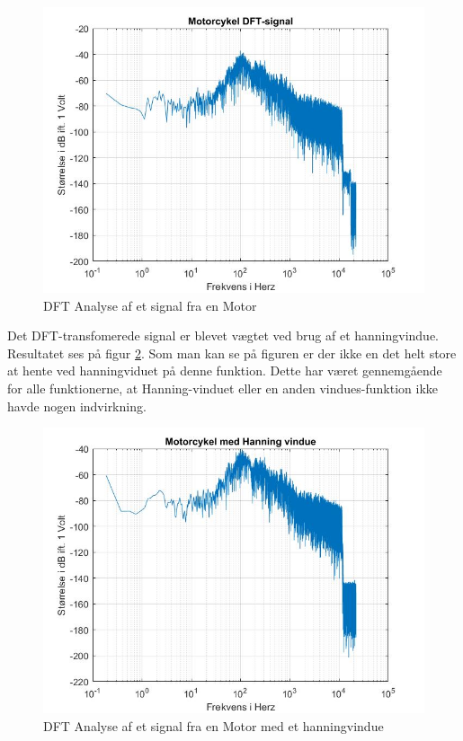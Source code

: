 \begin{figure}[H]
	\centering
	\includegraphics[width=120mm]{figures/Motor/DFT.jpg}
	\caption{DFT Analyse af et signal fra en Motor}
	\label{fig:Motor DFT}
\end{figure}

Det DFT-transfomerede signal er blevet vægtet ved brug af et hanningvindue. Resultatet ses på figur \ref{fig:Motor hanning}. Som man kan se på figuren er der ikke en det helt store at hente ved hanningviduet på denne funktion. Dette har været gennemgående for alle funktionerne, at Hanning-vinduet eller en anden vindues-funktion ikke havde nogen indvirkning.
\begin{figure}[H]
	\centering
	\includegraphics[width=120mm]{figures/Motor/hanning.jpg}
	\caption{DFT Analyse af et signal fra en Motor med et hanningvindue}
	\label{fig:Motor hanning}
\end{figure}

